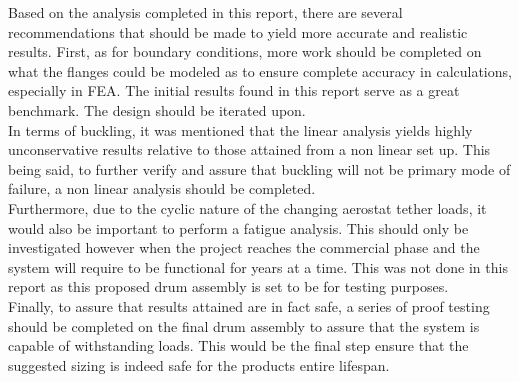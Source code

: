 
Based on the analysis completed in this report, there are several recommendations that should be made to yield more accurate and realistic results. First, as for boundary conditions, more work should be completed on what the flanges could be modeled as to ensure complete accuracy in calculations, especially in FEA. The initial results found in this report serve as a great benchmark. The design should be iterated upon.\\

In terms of buckling, it was mentioned that the linear analysis yields highly unconservative results relative to those attained from a non linear set up. This being said, to further verify and assure that buckling will not be primary mode of failure, a non linear analysis should be completed.\\

Furthermore, due to the cyclic nature of the changing aerostat tether loads, it would also be important to perform a fatigue analysis. This should only be investigated however when the project reaches the commercial phase and the system will require to be functional for years at a time. This was not done in this report as this proposed drum assembly is set to be for testing purposes.\\

Finally, to assure that results attained are in fact safe, a series of proof testing should be completed on the final drum assembly to assure that the system is capable of withstanding loads. This would be the final step ensure that the suggested sizing is indeed safe for the products entire lifespan.\\
